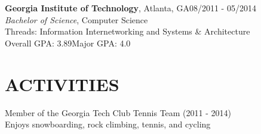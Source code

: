 \documentclass[margin,11pt]{res}
\begin{document}
\begin{resume}
\textbf{Georgia Institute of Technology}, Atlanta, GA\hfill 08/2011 - 05/2014\\
{\sl Bachelor of Science}, Computer Science\\
Threads: Information Internetworking and Systems \& Architecture\\
Overall GPA: 3.89\hspace{10mm}Major GPA: 4.0

\section{ACTIVITIES}
Member of the Georgia Tech Club Tennis Team (2011 - 2014)\\
Enjoys snowboarding, rock climbing, tennis, and cycling

\end{resume}
\end{document}
